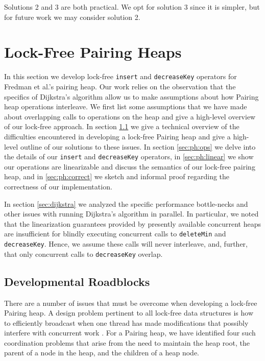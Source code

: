 \documentclass{acm_proc_article-sp}
\begin{document}
Solutions 2 and 3 are both practical. We opt for solution 3 since it is simpler, but
for future work we may consider solution 2.

\section{Lock-Free Pairing Heaps}
\label{sec:ph}

In this section we develop lock-free \texttt{insert} and \texttt{decreaseKey}
operators for Fredman et al.'s pairing heap. Our
work relies on the observation that
the specifics of
Dijkstra's algorithm allow us to make assumptions about how
Pairing heap operations interleave. 
We first list some assumptions that we have made about overlapping
calls to operations on the heap and give a high-level overview
of our lock-free approach. In section \ref{sec:ph:roadblocks}
we give a technical overview of the difficulties encountered
in developing a lock-free Pairing heap and give a high-level
outline of our solutions to these issues.
In section \ref{sec:ph:ops} we delve into the details of our
\texttt{insert} and \texttt{decreaseKey} operators, in \ref{sec:ph:linear} we show
our operations are linearizable and discuss the semantics
of our lock-free pairing heap, and in \ref{sec:ph:correct} we sketch and informal proof
regarding the correctness
of our implementation.

In section \ref{sec:dijkstra} we analyzed the specific performance bottle-necks and other
issues with running Dijkstra's algorithm in parallel. In particular, we noted that the
linearization guarantees provided by presently available concurrent heaps are insufficient for
blindly executing
concurrent calls to \texttt{deleteMin} and \texttt{decreaseKey}. Hence, we assume
these calls will never interleave, and, further, that only concurrent calls to 
\texttt{decreaseKey} overlap.

\subsection{Developmental Roadblocks}
\label{sec:ph:roadblocks}

There are a number of issues that must be overcome when developing
a lock-free Pairing heap. A design problem pertinent to all lock-free data
structures is how to efficiently broadcast when one thread has made modifications
that possibly interfere with concurrent work \cite{herlihy91}. 
For a Pairing heap, we have identified
four such coordination problems that arise from the need to
maintain the heap root, the parent of a node in the heap, and
the children of a heap node.
\end{document}
